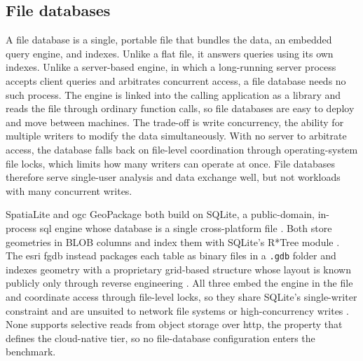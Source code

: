\subsection{File databases}
\label{background:spatial-data-formats-and-storage-models:file-databases}
A file database is a single, portable file that bundles the data, an embedded query engine, and indexes. Unlike a flat file, it answers queries using its own indexes. Unlike a server-based engine, in which a long-running server process accepts client queries and arbitrates concurrent access, a file database needs no such process. The engine is linked into the calling application as a library and reads the file through ordinary function calls, so file databases are easy to deploy and move between machines. The trade-off is write concurrency, the ability for multiple writers to modify the data simultaneously. With no server to arbitrate access, the database falls back on file-level coordination through operating-system file locks, which limits how many writers can operate at once. File databases therefore serve single-user analysis and data exchange well, but not workloads with many concurrent writes.

SpatiaLite and \acrshort{ogc} GeoPackage both build on SQLite, a public-domain, in-process \acrfull{sql} engine whose database is a single cross-platform file \parencite{sqlite2024_about, gaia2011_spatialite_manual, ogc2024_geopackage_encoding_standard_140}. Both store geometries in BLOB columns and index them with SQLite's R*Tree module \parencite{gaia2011_blob_geometry, sqlite2024_rtree_module, ogc2024_geopackage_encoding_standard_140}. The \acrshort{esri} \acrfull{fgdb} instead packages each table as binary files in a \texttt{.gdb} folder and indexes geometry with a proprietary grid-based structure whose layout is known publicly only through reverse engineering \parencite{rouault2013_filegdb_format_specification, gdal2025_openfilegdb_driver}. All three embed the engine in the file and coordinate access through file-level locks, so they share SQLite's single-writer constraint and are unsuited to network file systems or high-concurrency writes \parencite{sqlite2024_appropriate_uses}. None supports selective reads from object storage over \acrshort{http}, the property that defines the cloud-native tier, so no file-database configuration enters the benchmark.

